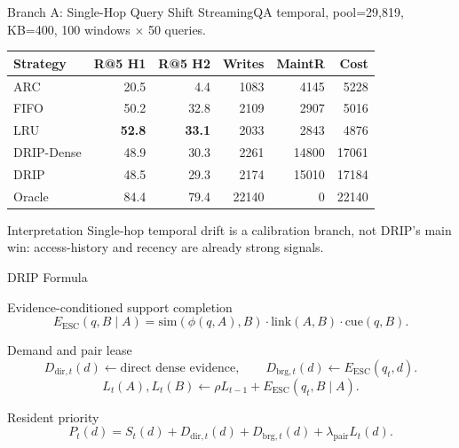 \documentclass[aspectratio=169,10pt]{beamer}
\newcommand{\esc}{E_{\mathrm{ESC}}}
\begin{document}
\begin{frame}{Branch A: Single-Hop Query Shift}
  \small
  StreamingQA temporal, pool=29,819, KB=400, 100 windows $\times$ 50 queries.

  \begin{table}
  \centering
  \begin{tabular}{lrrrrr}
    \toprule
    Strategy & R@5 H1 & R@5 H2 & Writes & MaintR & Cost \\
    \midrule
    ARC & 20.5 & 4.4 & 1083 & 4145 & 5228 \\
    FIFO & 50.2 & 32.8 & 2109 & 2907 & 5016 \\
    LRU & \textbf{52.8} & \textbf{33.1} & 2033 & 2843 & 4876 \\
    DRIP-Dense & 48.9 & 30.3 & 2261 & 14800 & 17061 \\
    DRIP & 48.5 & 29.3 & 2174 & 15010 & 17184 \\
    Oracle & 84.4 & 79.4 & 22140 & 0 & 22140 \\
    \bottomrule
  \end{tabular}
  \end{table}

  \begin{block}{Interpretation}
    Single-hop temporal drift is a calibration branch, not DRIP's main win:
    access-history and recency are already strong signals.
  \end{block}
\end{frame}

\begin{frame}{DRIP Formula}
  \begin{block}{Evidence-conditioned support completion}
    \[
      \esc(q,B \mid A)
      = \mathrm{sim}(\phi(q,A),B)\cdot \mathrm{link}(A,B)\cdot \mathrm{cue}(q,B).
    \]
  \end{block}

  \begin{block}{Demand and pair lease}
    \[
      D_{\mathrm{dir},t}(d) \leftarrow \text{direct dense evidence},
      \qquad
      D_{\mathrm{brg},t}(d) \leftarrow \esc(q_t,d).
    \]
    \[
      L_t(A),L_t(B) \leftarrow \rho L_{t-1} + \esc(q_t,B\mid A).
    \]
  \end{block}

  \begin{block}{Resident priority}
    \[
      P_t(d)=S_t(d)+D_{\mathrm{dir},t}(d)+D_{\mathrm{brg},t}(d)+\lambda_{\mathrm{pair}}L_t(d).
    \]
  \end{block}
\end{frame}
\end{document}
